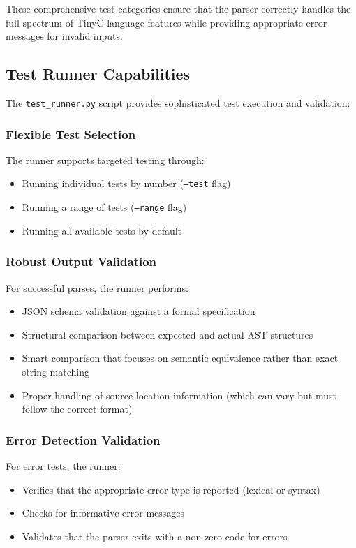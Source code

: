 These comprehensive test categories ensure that the parser correctly handles the full spectrum of TinyC language features while providing appropriate error messages for invalid inputs.

\subsection{Test Runner Capabilities}
The \texttt{test_runner.py} script provides sophisticated test execution and validation:
\subsubsection*{Flexible Test Selection}
The runner supports targeted testing through:
\begin{itemize}
\item Running individual tests by number (\texttt{--test} flag)
\item Running a range of tests (\texttt{--range} flag)
\item Running all available tests by default
\end{itemize}
\subsubsection*{Robust Output Validation}
For successful parses, the runner performs:
\begin{itemize}
\item JSON schema validation against a formal specification
\item Structural comparison between expected and actual AST structures
\item Smart comparison that focuses on semantic equivalence rather than exact string matching
\item Proper handling of source location information (which can vary but must follow the correct format)
\end{itemize}
\subsubsection*{Error Detection Validation}
For error tests, the runner:
\begin{itemize}
\item Verifies that the appropriate error type is reported (lexical or syntax)
\item Checks for informative error messages
\item Validates that the parser exits with a non-zero code for errors
\end{itemize}
